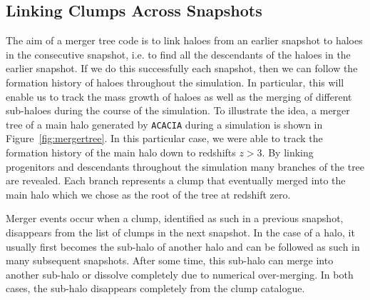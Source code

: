 \documentclass[a4paper,twocolumn,fleqn,usenatbib]{mnras}
\begin{document}
\subsection{Linking Clumps Across Snapshots}

The aim of a merger tree code is to link haloes from an earlier
snapshot to haloes in the consecutive snapshot, i.e. to find all the
descendants of the haloes in the earlier snapshot. If we do this 
successfully each snapshot, then we can follow the formation history of 
haloes throughout the simulation. In particular, this will enable us
to track the mass growth of haloes as well as the merging of different
sub-haloes during the course of the simulation. 
To illustrate the idea, a merger tree of a main halo generated by 
\texttt{ACACIA} during a simulation is shown in Figure~\ref{fig:mergertree}.
In this particular case, we were able to track the formation history of the 
main halo down to redshifts $z > 3$. By linking progenitors and descendants 
throughout the simulation many branches of the tree are revealed. 
Each branch represents a clump that eventually merged into the main halo 
which we chose as the root of the tree at redshift zero.

Merger events occur when a clump, identified as such in a previous
snapshot, disappears from the list of clumps in the next snapshot. In
the case of a halo, it usually first becomes the sub-halo of another
halo and can be followed as such in many subsequent snapshots. After
some time, this sub-halo can merge into another sub-halo or dissolve
completely due to numerical over-merging. In both cases, the sub-halo
disappears completely from the clump catalogue.
\end{document}
